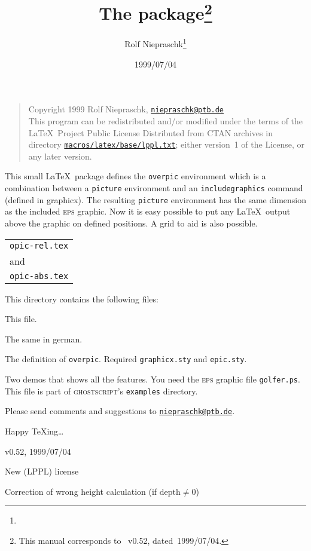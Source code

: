 \documentclass[pagesize=auto, fontsize=12pt, parskip=half, DIV=11]{scrartcl}
\title{The \pkg{overpic} package\thanks{This manual corresponds to \pkg{overpic}~v0.52, dated~1999/07/04.}}
\author{Rolf Niepraschk\thanks{\mail{niepraschk@ptb.de}}}
\date{1999/07/04}
\newcommand*{\mail}[1]{\href{mailto:#1}{\texttt{#1}}}
\newcommand*{\pkg}[1]{\textsf{#1}}
\newcommand*{\env}[1]{\texttt{#1}}
\begin{document}
\maketitle

\noindent

\begin{quote}
  \footnotesize
  Copyright  1999 Rolf Niepraschk, \mail{niepraschk@ptb.de}\\
  This program can be redistributed and/or modified under the terms
  of the \LaTeX\ Project Public License Distributed from CTAN
  archives in directory \href{http://ctan.org/macros/latex/base/lppl.txt}{\texttt{macros/latex/base\slash lppl.txt}}; either
  version~1 of the License, or any later version.
\end{quote}

This small \LaTeX\ package defines the \env{overpic} environment which is
a combination between a \env{picture} environment and an \env{includegraphics}
command (defined in \pkg{graphicx}). The resulting \env{picture} environment has
the same dimension as the included \textsc{eps} graphic. Now it is easy possible
to put any \LaTeX\ output above the graphic on defined positions. A grid
to aid is also possible.

\begin{lrbox}{\tempbox}
  \begin{tabular}[b]{@{}l@{}}
    \texttt{opic-rel.tex} \\
    and                   \\
    \texttt{opic-abs.tex}
  \end{tabular}
\end{lrbox}

This directory contains the following files:
%
\begin{labeling}[\hspace{\labelsep}--]{\usebox{\tempbox}}
\item[\texttt{README}] This file.
\item[\texttt{README.de}] The same in german.
\item[\texttt{overpic.sty}] The definition of \env{overpic}. Required \env{graphicx.sty} and \env{epic.sty}.
\item[\usebox{\tempbox}] Two demos that shows all the features. You need the \textsc{eps} graphic file \texttt{golfer.ps}. This file is part of \textsc{ghostscript}'s  \texttt{examples} directory.
\end{labeling}
               
Please send comments and suggestions to \mail{niepraschk@ptb.de}.

Happy \TeX ing\ldots



\begin{labeling}[\hspace{\labelsep}--]{v0.52, 1999/07/04}
  \item[v0.51, 1999/03/02] New (LPPL) license
  \item[v0.52, 1999/07/04] Correction of wrong height calculation (if $\mathrm{depth} \ne 0$)
\end{labeling}
\end{document}
